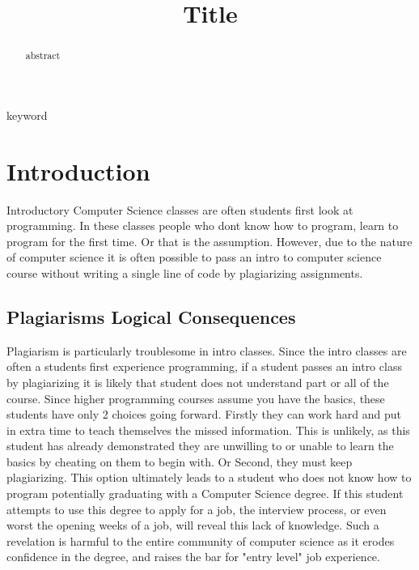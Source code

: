 \documentclass[conference]{IEEEtran}
\begin{document}
\onecolumn
\makeatletter
\newlength{\logoheight}
\setlength{\logoheight}{50pt} %

    

\title{
    \textbf{Title}}

\author{
}

\maketitle

\begin{abstract}
abstract
\end{abstract}

\begin{IEEEkeywords}
keyword
\end{IEEEkeywords}

\section{\textbf{Introduction}}
	Introductory Computer Science classes are often students first look at programming.  In these classes people who dont know how to program, learn to program for the first time.  Or that is the assumption.  However, due to the nature of computer science it is often possible to pass an intro to computer science course without writing a single line of code by plagiarizing assignments.
	\subsection{Plagiarisms Logical Consequences}
		Plagiarism is particularly troublesome in intro classes.  Since the intro classes are often a students first experience programming, if a student passes an intro class by plagiarizing it is likely that student does not understand part or all of the course.  Since higher programming courses assume you have the basics, these students have only 2 choices going forward.  Firstly they can work hard and put in extra time to teach themselves the missed information.  This is unlikely, as this student has already demonstrated they are unwilling to or unable to learn the basics by cheating on them to begin with.
		Or Second, they must keep plagiarizing.  This option ultimately leads to a student who does not know how to program potentially graduating with a Computer Science degree.  If this student attempts to use this degree to apply for a job, the interview process, or even worst the opening weeks of a job, will reveal this lack of knowledge.  Such a revelation is harmful to the entire community of computer science as it erodes confidence in the degree, and raises the bar for "entry level" job experience.
\end{document}
